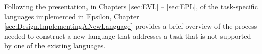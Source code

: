 Following the presentation, in Chapters \ref{sec:EVL} -- \ref{sec:EPL}, of the task-specific languages implemented in Epsilon, Chapter \ref{sec:Design.ImplementingANewLanguage} provides a brief overview of the process needed to construct a new language that addresses a task that is not supported by one of the existing languages.

















